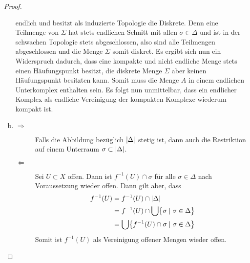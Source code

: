 \begin{Satz}
\begin{proof}
\begin{enumerate}[(a)]
            endlich und besitzt als induzierte Topologie die
            Diskrete. Denn eine Teilmenge von $\Sigma$ hat stets
            endlichen Schnitt mit allen $\sigma \in \Delta$ und ist in
            der schwachen Topologie stets abgeschlossen, also sind
            alle Teilmengen abgeschlossen und die Menge $\Sigma$ somit
            diskret.
            Es ergibt sich nun ein Widerspruch dadurch, dass eine
            kompakte und nicht endliche Menge stets einen
            Häufungspunkt besitzt, die diskrete Menge $\Sigma$ aber
            keinen Häufungspunkt besitzten kann.
            Somit muss die Menge $A$ in einem endlichen Unterkomplex
            enthalten sein. Es folgt nun unmittelbar, dass ein endlicher
            Komplex als endliche Vereinigung der kompakten Komplexe
            wiederum kompakt ist.
          \item 
            \begin{description}
            \item[\glqq $\Rightarrow$\grqq] Falls die Abbildung
              bezüglich $\left| \Delta \right|$ stetig ist, dann auch die
              Restriktion auf einem Unterraum
              $\sigma \subset \left| \Delta \right|$.
            \item[\glqq $\Leftarrow$ \grqq] Sei $U \subset X$ offen.
              Dann ist $f^{-1}(U) \cap \sigma$ für alle
              $\sigma \in \Delta$ nach Voraussetzung wieder offen.
              Dann gilt aber, dass
              \begin{align*}
                f^{-1}(U) &= f^{-1} (U) \cap \gr{\Delta} \\ 
                          &= f^{-1} (U) \cap \bigcup \set{\sigma }%
                            { \sigma \in \Delta} \\ 
                          &= \bigcup \set{ f^{-1}(U) \cap \sigma }%
                            { \sigma \in \Delta}
              \end{align*}
              Somit ist $f^{-1}(U)$  als Vereinigung offener Mengen wieder offen.
            \end{description}
          \end{enumerate}
	\end{proof}
\end{Satz}

